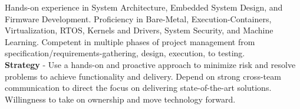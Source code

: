 Hands-on experience in System Architecture, Embedded System Design, and Firmware Development. Proficiency in Bare-Metal, Execution-Containers, Virtualization, RTOS, \faLinux Kernels and Drivers, System Security, and Machine Learning. Competent in multiple phases of project management from specification/requirements-gathering, design, execution, to testing.\\
\textbf{Strategy} - Use a hands-on and proactive approach to minimize risk and resolve problems to achieve functionality and delivery. Depend on strong cross-team communication to direct the focus on delivering state-of-the-art solutions. Willingness to take on ownership and move technology forward.